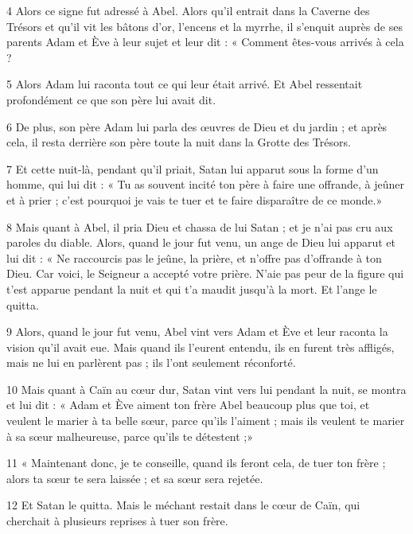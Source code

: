 \par 4 Alors ce signe fut adressé à Abel. Alors qu'il entrait dans la Caverne des Trésors et qu'il vit les bâtons d'or, l'encens et la myrrhe, il s'enquit auprès de ses parents Adam et Ève à leur sujet et leur dit : « Comment êtes-vous arrivés à cela ?

\par 5 Alors Adam lui raconta tout ce qui leur était arrivé. Et Abel ressentait profondément ce que son père lui avait dit.

\par 6 De plus, son père Adam lui parla des œuvres de Dieu et du jardin ; et après cela, il resta derrière son père toute la nuit dans la Grotte des Trésors.

\par 7 Et cette nuit-là, pendant qu'il priait, Satan lui apparut sous la forme d'un homme, qui lui dit : « Tu as souvent incité ton père à faire une offrande, à jeûner et à prier ; c'est pourquoi je vais te tuer et te faire disparaître de ce monde.»

\par 8 Mais quant à Abel, il pria Dieu et chassa de lui Satan ; et je n'ai pas cru aux paroles du diable. Alors, quand le jour fut venu, un ange de Dieu lui apparut et lui dit : « Ne raccourcis pas le jeûne, la prière, et n'offre pas d'offrande à ton Dieu. Car voici, le Seigneur a accepté votre prière. N'aie pas peur de la figure qui t'est apparue pendant la nuit et qui t'a maudit jusqu'à la mort. Et l'ange le quitta.

\par 9 Alors, quand le jour fut venu, Abel vint vers Adam et Ève et leur raconta la vision qu'il avait eue. Mais quand ils l'eurent entendu, ils en furent très affligés, mais ne lui en parlèrent pas ; ils l'ont seulement réconforté.

\par 10 Mais quant à Caïn au cœur dur, Satan vint vers lui pendant la nuit, se montra et lui dit : « Adam et Ève aiment ton frère Abel beaucoup plus que toi, et veulent le marier à ta belle sœur, parce qu'ils l'aiment ; mais ils veulent te marier à sa sœur malheureuse, parce qu'ils te détestent ;»

\par 11 « Maintenant donc, je te conseille, quand ils feront cela, de tuer ton frère ; alors ta sœur te sera laissée ; et sa sœur sera rejetée.

\par 12 Et Satan le quitta. Mais le méchant restait dans le cœur de Caïn, qui cherchait à plusieurs reprises à tuer son frère.



